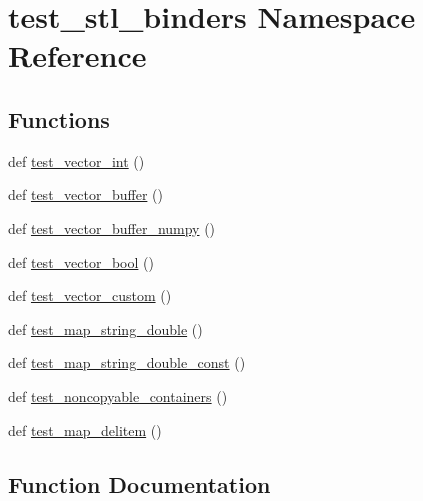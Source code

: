 \hypertarget{namespacetest__stl__binders}{}\section{test\+\_\+stl\+\_\+binders Namespace Reference}
\label{namespacetest__stl__binders}
\subsection*{Functions}
\begin{DoxyCompactItemize}
\item 
def \mbox{\hyperlink{namespacetest__stl__binders_a1c96e1186004f15eda25dd7a5d14c571}{test\+\_\+vector\+\_\+int}} ()
\item 
def \mbox{\hyperlink{namespacetest__stl__binders_ae7ac283e0a254858fcdd95ad51da8fcc}{test\+\_\+vector\+\_\+buffer}} ()
\item 
def \mbox{\hyperlink{namespacetest__stl__binders_a4791eb20d21f8187d264a0a223f9a39b}{test\+\_\+vector\+\_\+buffer\+\_\+numpy}} ()
\item 
def \mbox{\hyperlink{namespacetest__stl__binders_ae2d1291022ad7148c668995272f96480}{test\+\_\+vector\+\_\+bool}} ()
\item 
def \mbox{\hyperlink{namespacetest__stl__binders_ac6b8f7c8c0e3758b4e55573b715eba4e}{test\+\_\+vector\+\_\+custom}} ()
\item 
def \mbox{\hyperlink{namespacetest__stl__binders_ac82d77a5784f08083cadfd11d3334e06}{test\+\_\+map\+\_\+string\+\_\+double}} ()
\item 
def \mbox{\hyperlink{namespacetest__stl__binders_a9caaee7d60aa36f5ea59f4536ebc7be7}{test\+\_\+map\+\_\+string\+\_\+double\+\_\+const}} ()
\item 
def \mbox{\hyperlink{namespacetest__stl__binders_a2567a44930fac8337b541965771231f3}{test\+\_\+noncopyable\+\_\+containers}} ()
\item 
def \mbox{\hyperlink{namespacetest__stl__binders_a7c684385c263cdb38b54c5069347cdcb}{test\+\_\+map\+\_\+delitem}} ()
\end{DoxyCompactItemize}


\subsection{Function Documentation}
\mbox{\label{namespacetest__stl__binders_a7c684385c263cdb38b54c5069347cdcb}} 
